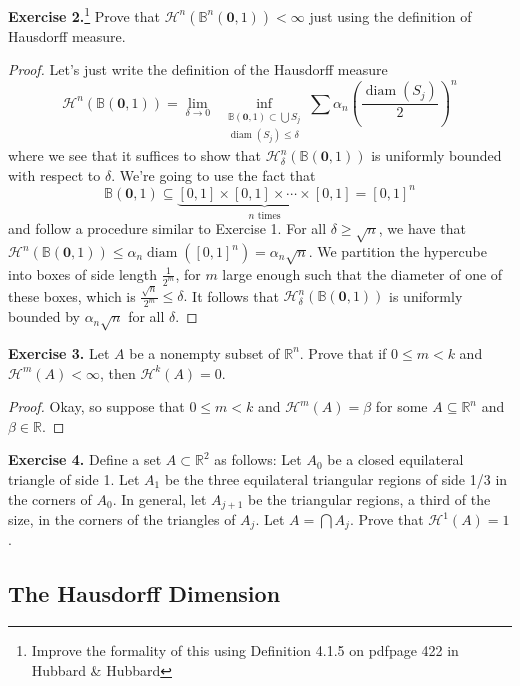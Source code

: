 \documentclass[10pt]{article}
\theoremstyle{plain}
\DeclareMathOperator{\diam}{diam}
\begin{document}
	\newpage 
	\noindent \textbf{Exercise 2.}\footnote{Improve the formality of this using Definition 4.1.5 on pdfpage 422 in Hubbard \& Hubbard} Prove that $\mathcal{H}^n(\mathbb{B}^n(\mathbf{0}, 1)) < \infty$ just using the definition of Hausdorff measure.
		\begin{proof}
			Let's just write the definition of the Hausdorff measure
				$$\mathcal{H}^n(\mathbb{B}(\mathbf{0}, 1)) = \lim_{\delta \to 0} \ \ \inf_{\substack{\mathbb{B}(\mathbf{0}, 1) \subset \bigcup S_j \\ \diam(S_j) \leq \delta}} \sum \alpha_n \left(\frac{\diam(S_j)}{2}\right)^n$$ where we see that it suffices to show that $\mathcal{H}_\delta^n(\mathbb{B}(\mathbf{0}, 1))$ is uniformly bounded with respect to $\delta$. We're going to use the fact that $$\mathbb{B}(\mathbf{0}, 1) \subseteq \underbrace{[0, 1] \times [0, 1] \times \cdots \times [0, 1]}_{n \text{ times}} = [0, 1]^n$$ and follow a procedure similar to Exercise 1. For all $\delta \geq \sqrt{n}$, we have that $\mathcal{H}^n(\mathbb{B}(\mathbf{0}, 1)) \leq \alpha_n \diam([0, 1]^n) = \alpha_n \sqrt{n}.$ We partition the hypercube into boxes of side length $\frac{1}{2^m}$, for $m$ large enough such that the diameter of one of these boxes, which is $\frac{\sqrt{n}}{2^m} \leq \delta.$ It follows that $\mathcal{H}_\delta^n(\mathbb{B}(\mathbf{0}, 1))$ is uniformly bounded by $\alpha_n \sqrt{n}$ for all $\delta$. 
		\end{proof}
	
	\noindent \textbf{Exercise 3.} Let $A$ be a nonempty subset of $\mathbb{R}^n$. Prove that if $0 \leq m < k$ and $\mathcal{H}^m(A) < \infty$, then $\mathcal{H}^k(A) = 0$. 
		\begin{proof}
			Okay, so suppose that $0 \leq m < k$ and $\mathcal{H}^m(A) = \beta $ for some $A \subseteq \mathbb{R}^n$ and $\beta \in \mathbb{R}$. 
		\end{proof}
	
	\noindent \textbf{Exercise 4.} Define a set $A \subset \mathbb{R}^2$ as follows: Let $A_0$ be a closed equilateral triangle of side 1. Let $A_1$ be the three equilateral triangular regions of side 1/3 in the corners of $A_0$. In general, let $A_{j + 1}$ be the triangular regions, a third of the size, in the corners of the triangles of $A_j$. Let $A = \bigcap A_j$. Prove that $\mathcal{H}^1(A) = 1$. 

\newpage 
\subsection*{The Hausdorff Dimension}
\newpage 
\end{document}
